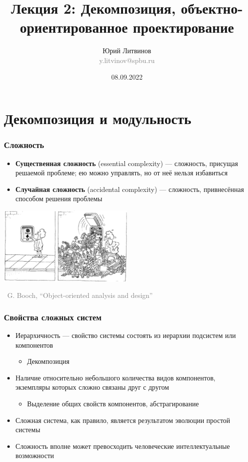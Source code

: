 \documentclass[xetex,mathserif,serif]{beamer}
\title[Декомпозиция, ООП]{Лекция 2: Декомпозиция, объектно-ориентированное проектирование}
\author[Юрий Литвинов]{Юрий Литвинов\\\small{\textcolor{gray}{y.litvinov@spbu.ru}}}
\date{08.09.2022}
\newcommand{\attribution}[1] {
    \begin{flushright}\begin{scriptsize}\textcolor{gray}{\textcopyright\, #1}\end{scriptsize}\end{flushright}
}
\begin{document}
    \frame{\titlepage}

    \section{Декомпозиция и модульность}

    \begin{frame}
        \frametitle{Сложность}
        \begin{itemize}
            \item \textbf{Существенная сложность} (essential complexity) --- сложность, присущая решаемой проблеме; ею можно управлять, но от неё нельзя избавиться
            \item \textbf{Случайная сложность} (accidental complexity) --- сложность, привнесённая способом решения проблемы
        \end{itemize}
        \vskip 0.5cm
        \begin{center}
            \includegraphics[width=0.5\textwidth]{complexityHiding.png}
        \end{center}
        \attribution{G. Booch, ``Object-oriented analysis and design''}
    \end{frame}

    \begin{frame}
        \frametitle{Свойства сложных систем}
        \begin{itemize}
            \item Иерархичность --- свойство системы состоять из иерархии подсистем или компонентов
            \begin{itemize}
                \item Декомпозиция
            \end{itemize}
            \item Наличие относительно небольшого количества видов компонентов, экземпляры которых сложно связаны друг с другом
            \begin{itemize}
                \item Выделение общих свойств компонентов, абстрагирование
            \end{itemize}
            \item Сложная система, как правило, является результатом эволюции простой системы
            \item Сложность вполне может превосходить человеческие интеллектуальные возможности
        \end{itemize}
    \end{frame}
\end{document}
